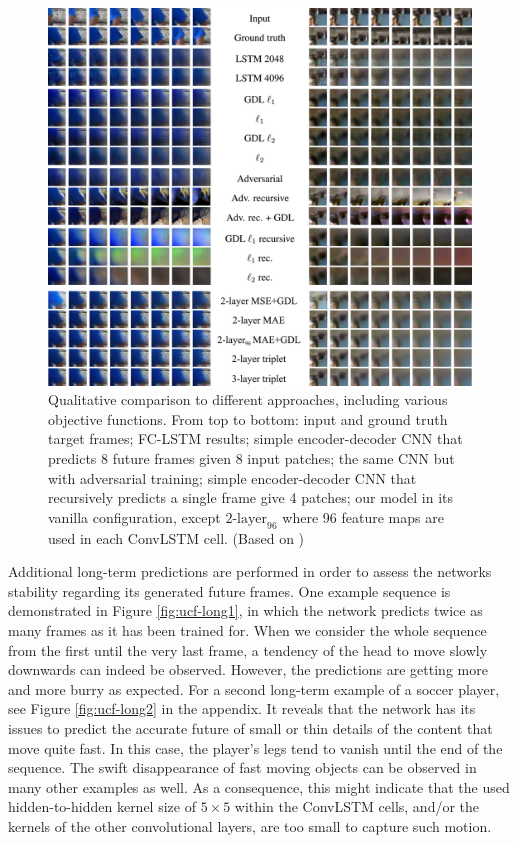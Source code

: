 \begin{figure}[htpb]
	\centering
	\includegraphics[width=1.0\linewidth]{figures/pred/ucf/ucf_compare.png} 
	\caption[Qualitative Comparison to Competing Models]{Qualitative comparison to different approaches, including various objective functions. From top to bottom: input and ground truth target frames; FC-LSTM results; simple encoder-decoder CNN that predicts 8 future frames given 8 input patches; the same CNN but with adversarial training; simple encoder-decoder CNN that recursively predicts a single frame give 4 patches; our model in its vanilla configuration, except $\text{2-layer}_{96}$ where 96 feature maps are used in each ConvLSTM cell. (Based on \parencite[p. 13]{deep_multiscale_video_pred})} \label{fig:ucf-comparison}
\end{figure}

Additional long-term predictions are performed in order to assess the networks stability regarding its generated future frames. One example sequence is demonstrated in Figure \ref{fig:ucf-long1}, in which the network predicts twice as many frames as it has been trained for. When we consider the whole sequence from the first until the very last frame, a tendency of the head to move slowly downwards can indeed be observed. However, the predictions are getting more and more burry as expected. For a second long-term example of a soccer player, see Figure \ref{fig:ucf-long2} in the appendix. It reveals that the network has its issues to predict the accurate future of small or thin details of the content that move quite fast. In this case, the player's legs tend to vanish until the end of the sequence. The swift disappearance of fast moving objects can be observed in many other examples as well. As a consequence, this might indicate that the used hidden-to-hidden kernel size of $5 \times 5$ within the ConvLSTM cells, and/or the kernels of the other convolutional layers, are too small to capture such motion. 

